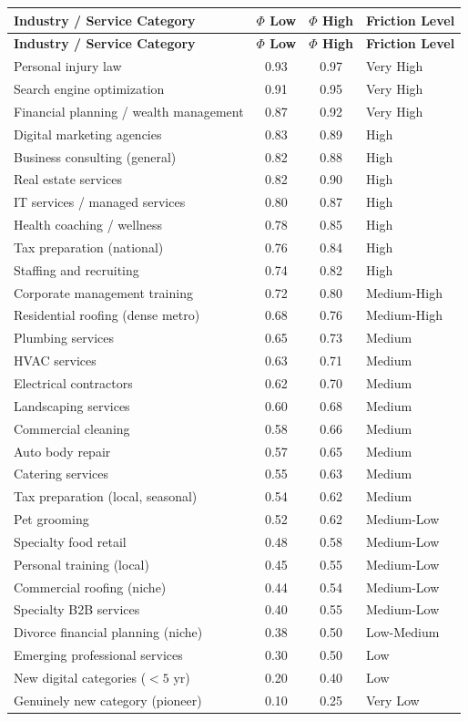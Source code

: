 \documentclass[12pt, openany]{book}
\theoremstyle{thmstyle}
\theoremstyle{defstyle}
\begin{document}
\begin{longtable}{p{2.6in}ccp{1.3in}}
\toprule
\textbf{Industry / Service Category} & \textbf{$\Phi$ Low} & \textbf{$\Phi$ High} & \textbf{Friction Level} \\
\midrule
\endfirsthead
\toprule
\textbf{Industry / Service Category} & \textbf{$\Phi$ Low} & \textbf{$\Phi$ High} & \textbf{Friction Level} \\
\midrule
\endhead
\bottomrule
\endlastfoot
Personal injury law & 0.93 & 0.97 & Very High \\
Search engine optimization & 0.91 & 0.95 & Very High \\
Financial planning / wealth management & 0.87 & 0.92 & Very High \\
Digital marketing agencies & 0.83 & 0.89 & High \\
Business consulting (general) & 0.82 & 0.88 & High \\
Real estate services & 0.82 & 0.90 & High \\
IT services / managed services & 0.80 & 0.87 & High \\
Health coaching / wellness & 0.78 & 0.85 & High \\
Tax preparation (national) & 0.76 & 0.84 & High \\
Staffing and recruiting & 0.74 & 0.82 & High \\
Corporate management training & 0.72 & 0.80 & Medium-High \\
Residential roofing (dense metro) & 0.68 & 0.76 & Medium-High \\
Plumbing services & 0.65 & 0.73 & Medium \\
HVAC services & 0.63 & 0.71 & Medium \\
Electrical contractors & 0.62 & 0.70 & Medium \\
Landscaping services & 0.60 & 0.68 & Medium \\
Commercial cleaning & 0.58 & 0.66 & Medium \\
Auto body repair & 0.57 & 0.65 & Medium \\
Catering services & 0.55 & 0.63 & Medium \\
Tax preparation (local, seasonal) & 0.54 & 0.62 & Medium \\
Pet grooming & 0.52 & 0.62 & Medium-Low \\
Specialty food retail & 0.48 & 0.58 & Medium-Low \\
Personal training (local) & 0.45 & 0.55 & Medium-Low \\
Commercial roofing (niche) & 0.44 & 0.54 & Medium-Low \\
Specialty B2B services & 0.40 & 0.55 & Medium-Low \\
Divorce financial planning (niche) & 0.38 & 0.50 & Low-Medium \\
Emerging professional services & 0.30 & 0.50 & Low \\
New digital categories ($< 5$ yr) & 0.20 & 0.40 & Low \\
Genuinely new category (pioneer) & 0.10 & 0.25 & Very Low \\
\end{longtable}
\end{document}
